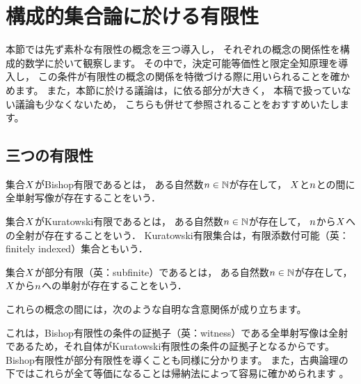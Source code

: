 \section{構成的集合論に於ける有限性}

本節では先ず素朴な有限性の概念を三つ導入し，
それぞれの概念の関係性を構成的数学に於いて観察します。
その中で，決定可能等価性と限定全知原理を導入し，
この条件が有限性の概念の関係を特徴づける際に用いられることを確かめます。
また，本節に於ける議論は，\cite{yotsunva:2024:intro}に依る部分が大きく，
本稿で扱っていない議論も少なくないため，
こちらも併せて参照されることをおすすめいたします。

\subsection{三つの有限性}

\begin{definition}[Bishop有限性]
    集合\(\Set\)がBishop有限であるとは，
    ある自然数\(\NaturalNumber\in\NaturalNumberSet\)が存在して，
    \(\Set\)と\(\NaturalNumber\)との間に全単射写像が存在することをいう．
\end{definition}

\begin{definition}[Kuratowski有限性]
    集合\(\Set\)がKuratowski有限であるとは，
    ある自然数\(\NaturalNumber\in\NaturalNumberSet\)が存在して，
    \(\NaturalNumber\)から\(\Set\)への全射が存在することをいう．
    Kuratowski有限集合は，有限添数付可能（英：finitely indexed）集合ともいう．
\end{definition}

\begin{definition}[部分有限性]
    集合\(\Set\)が部分有限（英：subfinite）であるとは，
    ある自然数\(\NaturalNumber\in\NaturalNumberSet\)が存在して，
    \(\Set\)から\(\NaturalNumber\)への単射が存在することをいう．
\end{definition}
これらの概念の間には，次のような自明な含意関係が成り立ちます。    
\begin{center}
\end{center}
これは，Bishop有限性の条件の証拠子（英：witness）である全単射写像は全射であるため，それ自体がKuratowski有限性の条件の証拠子となるからです。
Bishop有限性が部分有限性を導くことも同様に分かります。
また，古典論理の下ではこれらが全て等価になることは帰納法によって容易に確かめられます
。

